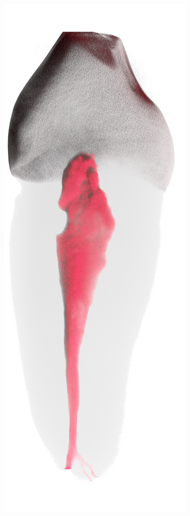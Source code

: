 \begin{frame}
\begin{frame}
		\includegraphics[height=\imageheight]{./images/rcs/Tooth0931}%
\end{frame}


\end{frame}
